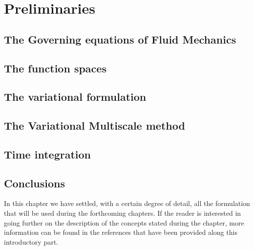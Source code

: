 
\chapter{Preliminaries}
\label{chap-Preliminaries}


\newcommand{\keyword}[1]{\textbf{#1}}
\newcommand{\tabhead}[1]{\textbf{#1}}
\newcommand{\code}[1]{\texttt{#1}}
\newcommand{\file}[1]{\texttt{\bfseries#1}}
\newcommand{\option}[1]{\texttt{\itshape#1}}


\section{The Governing equations of Fluid Mechanics}
\label{sec-C2_gov_eq}


\section{The function spaces}
\label{sec-C2_functional_spaces}


\section{The variational formulation}
\label{sec-C2_variational}


\section{The Variational Multiscale method}
\label{sec-C2_vms}


\section{Time integration}
\label{sec-C2_time_integration}


\section{Conclusions}
\label{sec-C2_conclusions}
In this chapter we have settled, with a certain degree of detail, all the formulation that will be used during the forthcoming chapters. If the reader is interested in going further on the description of the concepts stated during the chapter, more information can be found in the references that have been provided along this introductory part.

